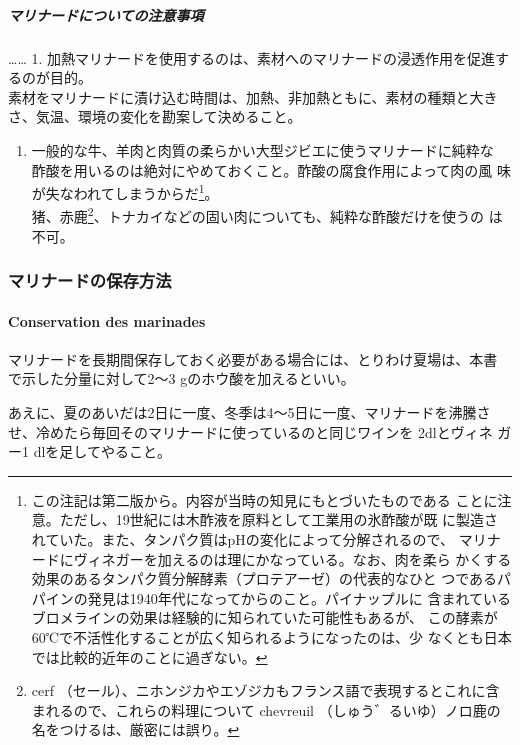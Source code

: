 \begin{recette}
\hypertarget{observation-sur-les-marinades}{%
\subparagraph{マリナードについての注意事項}\label{observation-sur-les-marinades}}

\ldots{}\ldots{} 1.
加熱マリナードを使用するのは、素材へのマリナードの浸透作用を促進するのが目的。\\
素材をマリナードに漬け込む時間は、加熱、非加熱ともに、素材の種類と大き
さ、気温、環境の変化を勘案して決めること。

\begin{enumerate}
\def\labelenumi{\arabic{enumi}.}
\setcounter{enumi}{1}
\tightlist
\item
  一般的な牛、羊肉と肉質の柔らかい大型ジビエに使うマリナードに純粋な
  酢酸を用いるのは絶対にやめておくこと。酢酸の腐食作用によって肉の風
  味が失なわれてしまうからだ\footnote{この注記は第二版から。内容が当時の知見にもとづいたものである
    ことに注意。ただし、19世紀には木酢液を原料として工業用の氷酢酸が既
    に製造されていた。また、タンパク質はpHの変化によって分解されるので、
    マリナードにヴィネガーを加えるのは理にかなっている。なお、肉を柔ら
    かくする効果のあるタンパク質分解酵素（プロテアーゼ）の代表的なひと
    つであるパパインの発見は1940年代になってからのこと。パイナップルに
    含まれているブロメラインの効果は経験的に知られていた可能性もあるが、
    この酵素が60℃で不活性化することが広く知られるようになったのは、少
    なくとも日本では比較的近年のことに過ぎない。}。\\
  猪、赤鹿\footnote{cerf
    （セール）、ニホンジカやエゾジカもフランス語で表現するとこれに含まれるので、これらの料理について
    chevreuil （しゅう゛るいゆ）ノロ鹿の名をつけるは、厳密には誤り。}、トナカイなどの固い肉についても、純粋な酢酸だけを使うの
  は不可。
\end{enumerate}

\hypertarget{ux30deux30eaux30caux30fcux30c9ux306eux4fddux5b58ux65b9ux6cd5}{%
\subsubsection{マリナードの保存方法}\label{ux30deux30eaux30caux30fcux30c9ux306eux4fddux5b58ux65b9ux6cd5}}

\hypertarget{conservation-des-marinades}{%
\paragraph{Conservation des
marinades}\label{conservation-des-marinades}}


マリナードを長期間保存しておく必要がある場合には、とりわけ夏場は、本書
で示した分量に対して2〜3 gのホウ酸を加えるといい。

あえに、夏のあいだは2日に一度、冬季は4〜5日に一度、マリナードを沸騰さ
せ、冷めたら毎回そのマリナードに使っているのと同じワインを 2dlとヴィネ
ガー1 dlを足してやること。
\end{recette}
